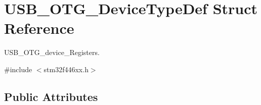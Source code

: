 \hypertarget{struct_u_s_b___o_t_g___device_type_def}{}\section{U\+S\+B\+\_\+\+O\+T\+G\+\_\+\+Device\+Type\+Def Struct Reference}
\label{struct_u_s_b___o_t_g___device_type_def}


U\+S\+B\+\_\+\+O\+T\+G\+\_\+device\+\_\+\+Registers.  




{\ttfamily \#include $<$stm32f446xx.\+h$>$}

\subsection*{Public Attributes}
